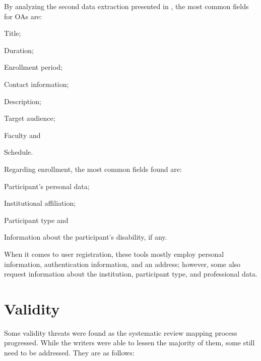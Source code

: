 \begin{itemize}
        By analyzing the second data extraction presented in , the most common fields for \acp{OA} are:
        \begin{inparaenum}[(a)]
          \item Title;
          \item Duration;
          \item Enrollment period;
          \item Contact information;
          \item Description;
          \item Target audience;
          \item Faculty and
          \item Schedule.
        \end{inparaenum}

        Regarding enrollment, the most common fields found are:
        \begin{inparaenum}[(a)]
          \item Participant's personal data;
          \item Institutional affiliation;
          \item Participant type and
          \item Information about the participant's disability, if any.
        \end{inparaenum}

        When it comes to user registration, these tools mostly employ personal information, authentication information, and an address; however, some also request information about the institution, participant type, and professional data.
\end{itemize}

\section{Validity}\label{sec:gl-validity}

Some validity threats were found as the systematic review mapping process progressed. While the writers were able to lessen the majority of them, some still need to be addressed. They are as follows:

